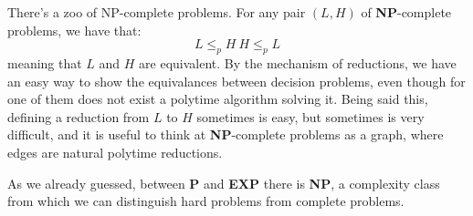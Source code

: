 There's a zoo of NP-complete problems. For any pair $(L,H)$ of \textbf{NP}-complete problems, we have that:
$$L \leq_{p} H \ H \leq_{p} L$$
meaning that $L$ and $H$ are equivalent. By the mechanism of reductions, we have an easy way to show the equivalances between decision problems, even though
for one of them does not exist a polytime algorithm solving it. Being said this, defining a reduction from $L$ to $H$ sometimes is easy, but sometimes is very 
difficult, and it is useful to think at \textbf{NP}-complete problems as a graph, where edges are natural polytime reductions. \vspace{7pt}

As we already guessed, between \textbf{P} and \textbf{EXP} there is \textbf{NP}, a complexity class from which we can distinguish hard problems from complete 
problems.